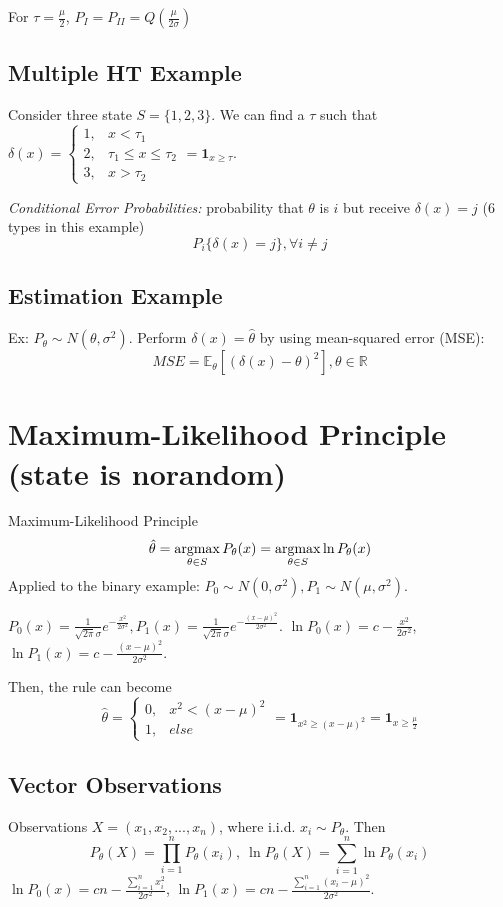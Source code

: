 \documentclass[11pt]{elegantbook}
\newcommand{\argmax}{\operatornamewithlimits{argmax}}
\begin{document}
For $\tau=\frac{\mu}{2}$, $P_I=P_{II}=Q\left(\frac{\mu}{2\sigma}\right)$

\subsection*{Multiple HT Example}
Consider three state $S=\{1,2,3\}$.
We can find a $\tau$ such that $\delta(x)=\left\{\begin{matrix}
    1,&x< \tau_1\\
    2,& \tau_1\leq x\leq \tau_2\\
    3,& x>\tau_2
\end{matrix}\right.=\mathbf{1}_{x\geq \tau}$.

\textit{Conditional Error Probabilities:} probability that $\theta$ is $i$ but receive $\delta(x)=j$ (6 types in this example) $$P_i\{\delta(x)=j\}, \forall i\neq j$$

\subsection*{Estimation Example}
Ex: $P_\theta\sim N(\theta,\sigma^2)$. Perform $\delta(x)=\hat{\theta}$ by using mean-squared error (MSE):
$$MSE= \mathbb{E}_\theta \left[(\delta(x)-\theta)^2\right],\theta\in \mathbb{R}$$

\section{Maximum-Likelihood Principle (state is norandom)}
Maximum-Likelihood Principle $$\hat{\theta}=\argmax_{\theta\in S}P_{\theta}(x)=\argmax_{\theta\in S}\ln P_{\theta}(x)$$
Applied to the binary example: $P_0\sim N(0,\sigma^2), P_1\sim N(\mu,\sigma^2)$.

$P_0(x)=\frac{1}{\sqrt{2\pi}\sigma}e^{-\frac{x^2}{2\sigma^2}}, P_1(x)=\frac{1}{\sqrt{2\pi}\sigma}e^{-\frac{(x-\mu)^2}{2\sigma^2}}$. $\ln P_0(x)=c-\frac{x^2}{2\sigma^2}$, $\ln P_1(x)=c-\frac{(x-\mu)^2}{2\sigma^2}$.

Then, the rule can become $$\hat{\theta}=\left\{\begin{matrix}
    0,&x^2<(x-\mu)^2\\
    1,&else
\end{matrix}\right.=\mathbf{1}_{x^2\geq (x-\mu)^2}=\mathbf{1}_{x\geq \frac{\mu}{2}}$$

\subsection*{Vector Observations}
Observations $X=\left(x_1,x_2,...,x_n\right)$, where i.i.d. $x_i\sim P_\theta$. Then $$P_\theta(X)=\prod_{i=1}^n P_\theta(x_i),\ \ln P_\theta(X)=\sum_{i=1}^n\ln P_\theta(x_i)$$
$\ln P_0(x)=cn-\frac{\sum_{i=1}^n x_i^2}{2\sigma^2}$, $\ln P_1(x)=cn-\frac{\sum_{i=1}^n(x_i-\mu)^2}{2\sigma^2}$.
\end{document}
